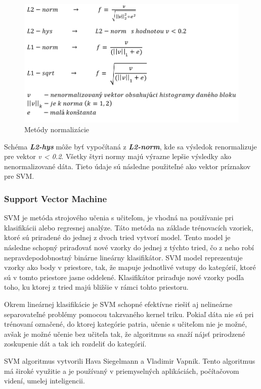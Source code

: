 \begin{figure}[!htbp]
  \centering
  \includegraphics[width=14cm]{img/HOGnorm.png}
  \caption{Metódy normalizácie}
  \label{HOGnorm}
\end{figure}

Schéma \textbf{\textit{L2-hys}} môže byť vypočítaná z \textbf{\textit{L2-norm}}, kde sa výsledok renormalizuje pre vektor \textit{v < 0.2}. Všetky štyri normy majú výrazne lepšie výsledky ako nenormalizované dáta. Tieto údaje sú následne použiteľné ako vektor príznakov pre SVM. \cite{c11}

\subsubsection{Support Vector Machine} \label{SVMlabel}
SVM je metóda strojového učenia s učiteľom, je vhodná na používanie pri klasifikácii alebo regresnej analýze. Táto metóda na základe trénovacích vzoriek, ktoré sú priradené do jednej z dvoch tried vytvorí model. Tento model je následne schopný priraďovať nové vzorky do jednej z týchto tried, čo z neho robí nepravdepodobnostný binárne lineárny klasifikátor. SVM model reprezentuje vzorky ako body v priestore, tak, že mapuje jednotlivé vstupy do kategórií, ktoré sú v tomto priestore jasne oddelené. Klasifikátor priraďuje nové vzorky podľa toho, ku ktorej z tried majú bližšie v rámci tohto priestoru.

Okrem lineárnej klasifikácie je SVM schopné efektívne riešiť aj nelineárne separovateľné problémy pomocou takzvaného kernel triku. Pokiaľ dáta nie sú pri trénovaní označené, do ktorej kategórie patria, učenie s učiteľom nie je možné, avšak je možné učenie bez učiteľa tak, že algoritmus sa snaží nájsť prirodzené zoskupenie dát a tak ich rozdeliť do kategórií.

SVM algoritmus vytvorili Hava Siegelmann a Vladimir Vapnik. Tento algoritmus má široké využitie a je používaný v priemyselných aplikáciách, počítačovom videní, umelej inteligencii.  \cite{c7}

